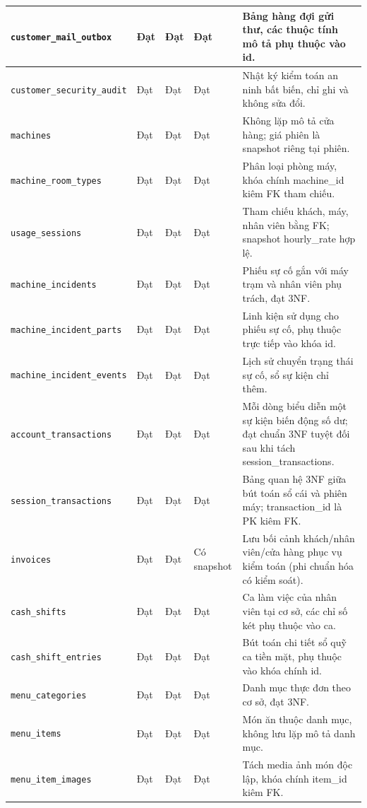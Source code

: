 \begin{table}[htbp]
\begin{tabularx}{\textwidth}{|>{\raggedright\arraybackslash}p{3.2cm}|>{\centering\arraybackslash}p{1.0cm}|>{\centering\arraybackslash}p{1.0cm}|>{\centering\arraybackslash}p{1.6cm}|X|}
\hline
\texttt{customer\_mail\_outbox} & Đạt & Đạt & Đạt & Bảng hàng đợi gửi thư, các thuộc tính mô tả phụ thuộc vào id. \\
\hline
\texttt{customer\_security\_audit} & Đạt & Đạt & Đạt & Nhật ký kiểm toán an ninh bất biến, chỉ ghi và không sửa đổi. \\
\hline
\texttt{machines} & Đạt & Đạt & Đạt & Không lặp mô tả cửa hàng; giá phiên là snapshot riêng tại phiên. \\
\hline
\texttt{machine\_room\_types} & Đạt & Đạt & Đạt & Phân loại phòng máy, khóa chính machine_id kiêm FK tham chiếu. \\
\hline
\texttt{usage\_sessions} & Đạt & Đạt & Đạt & Tham chiếu khách, máy, nhân viên bằng FK; snapshot hourly_rate hợp lệ. \\
\hline
\texttt{machine\_incidents} & Đạt & Đạt & Đạt & Phiếu sự cố gắn với máy trạm và nhân viên phụ trách, đạt 3NF. \\
\hline
\texttt{machine\_incident\_parts} & Đạt & Đạt & Đạt & Linh kiện sử dụng cho phiếu sự cố, phụ thuộc trực tiếp vào khóa id. \\
\hline
\texttt{machine\_incident\_events} & Đạt & Đạt & Đạt & Lịch sử chuyển trạng thái sự cố, sổ sự kiện chỉ thêm. \\
\hline
\texttt{account\_transactions} & Đạt & Đạt & Đạt & Mỗi dòng biểu diễn một sự kiện biến động số dư; đạt chuẩn 3NF tuyệt đối sau khi tách session_transactions. \\
\hline
\texttt{session\_transactions} & Đạt & Đạt & Đạt & Bảng quan hệ 3NF giữa bút toán sổ cái và phiên máy; transaction_id là PK kiêm FK. \\
\hline
\texttt{invoices} & Đạt & Đạt & Có snapshot & Lưu bối cảnh khách/nhân viên/cửa hàng phục vụ kiểm toán (phi chuẩn hóa có kiểm soát). \\
\hline
\texttt{cash\_shifts} & Đạt & Đạt & Đạt & Ca làm việc của nhân viên tại cơ sở, các chỉ số két phụ thuộc vào ca. \\
\hline
\texttt{cash\_shift\_entries} & Đạt & Đạt & Đạt & Bút toán chi tiết sổ quỹ ca tiền mặt, phụ thuộc vào khóa chính id. \\
\hline
\texttt{menu\_categories} & Đạt & Đạt & Đạt & Danh mục thực đơn theo cơ sở, đạt 3NF. \\
\hline
\texttt{menu\_items} & Đạt & Đạt & Đạt & Món ăn thuộc danh mục, không lưu lặp mô tả danh mục. \\
\hline
\texttt{menu\_item\_images} & Đạt & Đạt & Đạt & Tách media ảnh món độc lập, khóa chính item_id kiêm FK. \\

\end{tabularx}
\end{table}
